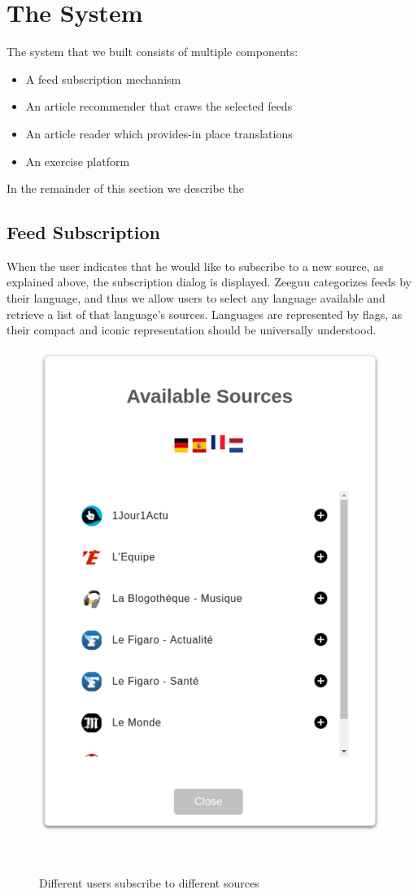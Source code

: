 
\newpage
\section{The System}

The system that we built consists of multiple components: 

\begin{itemize}
  \item A feed subscription mechanism
  \item An article recommender that craws the selected feeds
  \item An article reader which provides-in place translations
  \item An exercise platform 
\end{itemize}

In the remainder of this section we describe the 


\subsection {Feed Subscription}

When the user indicates that he would like to subscribe to a new source, as explained above, the subscription dialog is displayed. Zeeguu categorizes feeds by their language, and thus we allow users to select any language available and retrieve a list of that language’s sources. Languages are represented by flags, as their compact and iconic representation should be universally understood.

\begin{figure}[h!]
\centering
  \includegraphics[width=0.5\columnwidth]{figures/available_sources}
  \caption{Different users subscribe to different sources}~\label{fig:registrations}
\end{figure}


